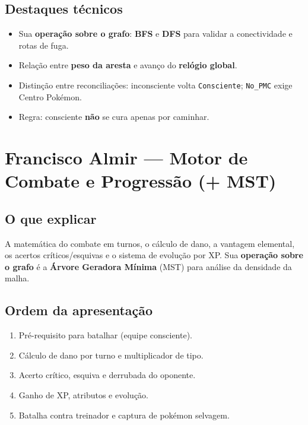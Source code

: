 \documentclass[11pt,a4paper]{article}
\begin{document}
\subsection{Destaques técnicos}
\begin{itemize}[leftmargin=2em,itemsep=2pt]
  \item Sua \textbf{operação sobre o grafo}: \textbf{BFS} e \textbf{DFS} para validar a conectividade e rotas de fuga.
  \item Relação entre \textbf{peso da aresta} e avanço do \textbf{relógio global}.
  \item Distinção entre reconciliações: inconsciente volta \texttt{Consciente}; \texttt{No\_PMC} exige Centro Pokémon.
  \item Regra: consciente \textbf{não} se cura apenas por caminhar.
\end{itemize}

\section{Francisco Almir --- Motor de Combate e Progressão (+ MST)}\label{sec:almir}

\subsection{O que explicar}
A matemática do combate em turnos, o cálculo de dano, a vantagem elemental,
os acertos críticos/esquivas e o sistema de evolução por XP. Sua
\textbf{operação sobre o grafo} é a \textbf{Árvore Geradora Mínima} (MST) para
análise da densidade da malha.

\subsection{Ordem da apresentação}
\begin{enumerate}[leftmargin=2em,itemsep=2pt]
  \item Pré-requisito para batalhar (equipe consciente).
  \item Cálculo de dano por turno e multiplicador de tipo.
  \item Acerto crítico, esquiva e derrubada do oponente.
  \item Ganho de XP, atributos e evolução.
  \item Batalha contra treinador e captura de pokémon selvagem.
\end{enumerate}
\end{document}
